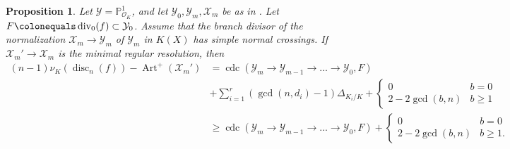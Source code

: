 \documentclass[12pt]{amsart}
\numberwithin{equation}{section}
\newtheorem{prop}[equation]{Proposition}
\theoremstyle{definition}
\newcommand{\padma}[1]{{\color{Magenta} \sf $\clubsuit\clubsuit\clubsuit$ Padma: [#1]}}
\newcommand{\andrew}[1]{{\color{Green} \sf $\diamondsuit\diamondsuit\diamondsuit$ Andrew: [#1]}}
\newcommand{\rev}[1]{{\color{Blue} \sf $\diamondsuit\diamondsuit\diamondsuit$ Rev: [#1]}}
\renewcommand{\O}{\mathcal{O}}
\renewcommand{\P}{\mathbb P}
\newcommand{\X}{\mathcal{X}}
\newcommand{\Y}{\mathcal{Y}}
\DeclareMathOperator{\divi}{div}
\DeclareMathOperator{\disc}{disc}
\DeclareMathOperator{\Art}{Art}
\DeclareMathOperator{\cdc}{cdc}
\begin{document}
\begin{prop}\label{prop: cond-disc ineq cdc version} Let $\Y=\P^1_{\O_K}$, and let $\Y_0,\Y_m,\X_m$ be as in . Let $F \colonequals \divi_0(f) \subset \Y_0$. 
    Assume that the branch divisor of the normalization $\X_m\to\Y_m$
    of $\Y_m$ in $K(X)$ has simple normal crossings. If
    $\mathcal{X}_m' \to \mathcal{X}_m$ is the minimal regular
    resolution, then
    \begin{align*}
        (n-1)\nu_K(\disc_n(f))-\Art^+(\mathcal{X}_m')&=\cdc(\Y_m\to\Y_{m-1}\to...\to\Y_0, F)\\
        &+\sum_{i=1}^r(\gcd(n,d_i)-1)\Delta_{K_i/K}+\begin{cases}0&b=0\\2-2\gcd(b,n)&b\geq1 \end{cases}\\
        &\geq \cdc(\Y_m\to\Y_{m-1}\to...\to\Y_0, F)+\begin{cases}0&b=0\\2-2\gcd(b,n)&b\geq1. \end{cases}
    \end{align*}
\end{prop}

\end{document}
